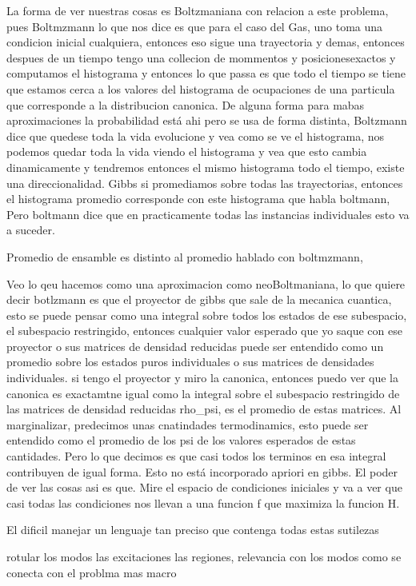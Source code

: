La forma de ver nuestras cosas es Boltzmaniana con relacion a este problema, pues Boltmzmann lo que nos dice es que para el caso del Gas, uno toma una condicion inicial cualquiera, entonces eso sigue una trayectoria y demas, entonces despues de un tiempo tengo una collecion de mommentos y posicionesexactos y computamos el histograma y entonces lo que passa es que todo el tiempo se tiene que estamos cerca a los valores del histograma de ocupaciones de una particula que corresponde a la distribucion canonica. De alguna forma para mabas aproximaciones la probabilidad está ahi pero se usa de forma distinta, Boltzmann dice que quedese toda la vida evolucione y vea como se ve el histograma, nos podemos quedar toda la vida viendo el histograma y vea que esto cambia dinamicamente y tendremos entonces el mismo histograma todo el tiempo, existe una direccionalidad. Gibbs si promediamos sobre todas las trayectorias, entonces el histograma promedio corresponde con este histograma que habla boltmann, Pero boltmann dice que en practicamente todas las instancias individuales esto va a suceder.


Promedio de ensamble es distinto al promedio hablado con boltmzmann, 

Veo lo qeu hacemos como una aproximacion como neoBoltmaniana, lo que quiere decir botlzmann es que el proyector de gibbs que sale de la mecanica cuantica, esto se puede pensar como una integral sobre todos los estados de ese subespacio, el subespacio restringido, entonces cualquier valor esperado que yo saque con ese proyector o sus matrices de densidad reducidas puede ser entendido como un promedio sobre los estados puros individuales o sus matrices de densidades individuales. si tengo el proyector y miro la canonica, entonces puedo ver que la canonica es exactamtne igual como la integral sobre el subespacio restringido de las matrices de densidad reducidas rho_psi, es el promedio de estas matrices. Al marginalizar, predecimos unas cnatindades termodinamics, esto puede ser entendido como el promedio de los psi de los valores esperados de estas cantidades. Pero lo que decimos es que casi todos los terminos en esa integral contribuyen de igual forma. Esto no está incorporado apriori en gibbs. El poder de ver las cosas asi es que. Mire el espacio de condiciones iniciales y va a ver que casi todas las condiciones nos llevan a una funcion f que maximiza la funcion H.

El dificil manejar un lenguaje tan preciso que contenga todas estas sutilezas




rotular los modos las excitaciones las regiones, relevancia con los modos como se conecta con el problma mas macro